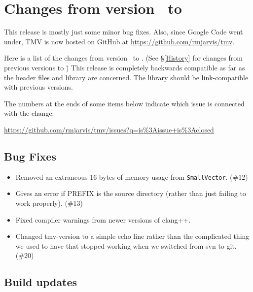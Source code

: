 
\section{Changes from version \prevtmvversion\ to \tmvversion}
\label{Changes}

This release is mostly just some minor bug fixes.  Also, since Google Code went under,
TMV is now hosted on GitHub at \url{https://github.com/rmjarvis/tmv}.

Here is a list of the changes from version \prevtmvversion\ to \tmvversion.  
(See \S\ref{History} for changes from previous versions to \prevtmvversion\.)
This release is completely backwards compatible as far as the header files and library are 
concerned.  The library should be link-compatible
with previous versions.

The numbers at the ends of some items below indicate which issue is connected
with the change:

\url{https://github.com/rmjarvis/tmv/issues?q=is\%3Aissue+is\%3Aclosed}

\subsection{Bug Fixes}

\begin{itemize}

\item Removed an extraneous 16 bytes of memory usage from \texttt{SmallVector}. (\#12)
\item Gives an error if PREFIX is the source directory (rather than just 
  failing to work properly). (\#13)
\item Fixed compiler warnings from newer versions of clang++.
\item Changed tmv-version to a simple echo line rather than the complicated
  thing we used to have that stopped working when we switched from svn
  to git. (\#20)
\end{itemize}

\subsection{Build updates}

